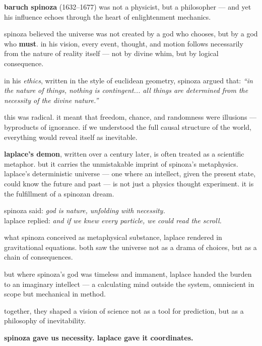 \begin{tcolorbox}[colback=gray!5!white, colframe=black!75!white, title={historical sidebar: spinoza and the god of necessity}]

    \textbf{baruch spinoza} (1632–1677) was not a physicist, but a philosopher — and yet his influence echoes through the heart of enlightenment mechanics.
    
    spinoza believed the universe was not created by a god who chooses, but by a god who \textbf{must}. in his vision, every event, thought, and motion follows necessarily from the nature of reality itself — not by divine whim, but by logical consequence.
    
    \medskip
    
    in his \textit{ethics}, written in the style of euclidean geometry, spinoza argued that:
        \textit{“in the nature of things, nothing is contingent... all things are determined from the necessity of the divine nature.”}
    
    this was radical. it meant that freedom, chance, and randomness were illusions — byproducts of ignorance. if we understood the full causal structure of the world, everything would reveal itself as inevitable.
    
    \medskip
    
    \textbf{laplace’s demon}, written over a century later, is often treated as a scientific metaphor. but it carries the unmistakable imprint of spinoza’s metaphysics. laplace’s deterministic universe — one where an intellect, given the present state, could know the future and past — is not just a physics thought experiment. it is the fulfillment of a spinozan dream.
    
        spinoza said: \textit{god is nature, unfolding with necessity.} \\
        laplace replied: \textit{and if we knew every particle, we could read the scroll.}
    
    what spinoza conceived as metaphysical substance, laplace rendered in gravitational equations. both saw the universe not as a drama of choices, but as a chain of consequences.
    
    \medskip
    
    but where spinoza’s god was timeless and immanent, laplace handed the burden to an imaginary intellect — a calculating mind outside the system, omniscient in scope but mechanical in method.
    
    together, they shaped a vision of science not as a tool for prediction, but as a philosophy of inevitability.
    
    \medskip
    
    \textbf{spinoza gave us necessity. laplace gave it coordinates.}
    
    \end{tcolorbox}
   
